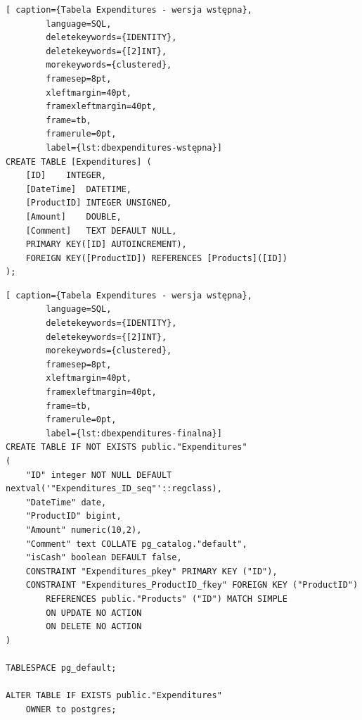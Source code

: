 \documentclass[a4paper,10pt, twoside]{report}
\begin{document}
\begin{large}
\begin{minipage}{\textwidth}
    \begin{lstlisting}[ caption={Tabela Expenditures - wersja wstępna},
        language=SQL,
        deletekeywords={IDENTITY},
        deletekeywords={[2]INT},
        morekeywords={clustered},
        framesep=8pt,
        xleftmargin=40pt,
        framexleftmargin=40pt,
        frame=tb,
        framerule=0pt,
        label={lst:dbexpenditures-wstępna}]
CREATE TABLE [Expenditures] (
    [ID]	INTEGER,
    [DateTime]	DATETIME,
    [ProductID]	INTEGER UNSIGNED,
    [Amount]	DOUBLE,
    [Comment]	TEXT DEFAULT NULL,
    PRIMARY KEY([ID] AUTOINCREMENT),
    FOREIGN KEY([ProductID]) REFERENCES [Products]([ID])
);\end{lstlisting}
\end{minipage}

\begin{minipage}{\textwidth}
    \begin{lstlisting}[ caption={Tabela Expenditures - wersja wstępna},
        language=SQL,
        deletekeywords={IDENTITY},
        deletekeywords={[2]INT},
        morekeywords={clustered},
        framesep=8pt,
        xleftmargin=40pt,
        framexleftmargin=40pt,
        frame=tb,
        framerule=0pt,
        label={lst:dbexpenditures-finalna}]
CREATE TABLE IF NOT EXISTS public."Expenditures"
(
    "ID" integer NOT NULL DEFAULT nextval('"Expenditures_ID_seq"'::regclass),
    "DateTime" date,
    "ProductID" bigint,
    "Amount" numeric(10,2),
    "Comment" text COLLATE pg_catalog."default",
    "isCash" boolean DEFAULT false,
    CONSTRAINT "Expenditures_pkey" PRIMARY KEY ("ID"),
    CONSTRAINT "Expenditures_ProductID_fkey" FOREIGN KEY ("ProductID")
        REFERENCES public."Products" ("ID") MATCH SIMPLE
        ON UPDATE NO ACTION
        ON DELETE NO ACTION
)

TABLESPACE pg_default;

ALTER TABLE IF EXISTS public."Expenditures"
    OWNER to postgres;\end{lstlisting}
\end{minipage}


\end{large}
\end{document}
